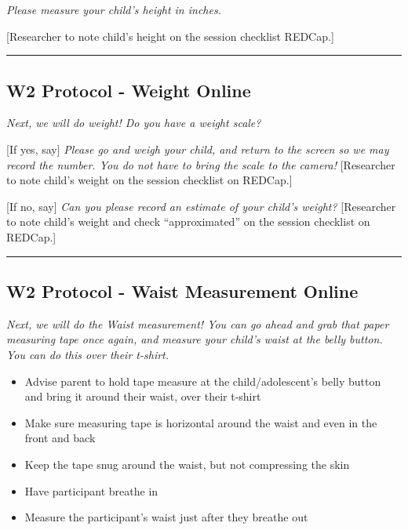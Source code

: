 \documentclass[]{book}
\begin{document}
\emph{Please measure your child's height in inches.}

{[}Researcher to note child's height on the session checklist REDCap.{]}

\begin{center}\rule{0.5\linewidth}{0.5pt}\end{center}

\hypertarget{w2-protocol---weight-online}{%
\subsection{W2 Protocol - Weight Online}\label{w2-protocol---weight-online}}

\emph{Next, we will do weight! Do you have a weight scale?}

{[}If yes, say{]} \emph{Please go and weigh your child, and return to the screen so we may record the number. You do not have to bring the scale to the camera!} {[}Researcher to note child's weight on the session checklist on REDCap.{]}

{[}If no, say{]} \emph{Can you please record an estimate of your child's weight?} {[}Researcher to note child's weight and check ``approximated'' on the session checklist on REDCap.{]}

\begin{center}\rule{0.5\linewidth}{0.5pt}\end{center}

\hypertarget{w2-protocol---waist-measurement-online}{%
\subsection{W2 Protocol - Waist Measurement Online}\label{w2-protocol---waist-measurement-online}}

\emph{Next, we will do the Waist measurement! You can go ahead and grab that paper measuring tape once again, and measure your child's waist at the belly button. You can do this over their t-shirt.}

\begin{itemize}
\item
  Advise parent to hold tape measure at the child/adolescent's belly button and bring it around their waist, over their t-shirt
\item
  Make sure measuring tape is horizontal around the waist and even in the front and back
\item
  Keep the tape snug around the waist, but not compressing the skin
\item
  Have participant breathe in
\item
  Measure the participant's waist just after they breathe out
\end{itemize}
\end{document}
